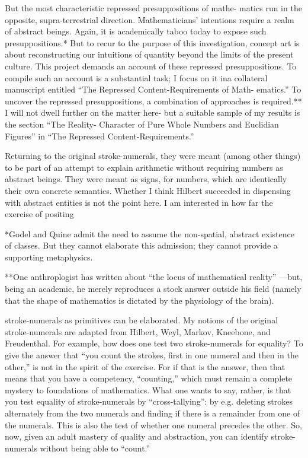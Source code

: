 But the most characteristic repressed presuppositions of mathe- 
matics run in the opposite, supra-terrestrial direction. Mathematicians’ 
intentions require a realm of abstract beings. Again, it is academically 
taboo today to expose such presuppositions.* But to recur to the 
purpose of this investigation, concept art is about reconstructing our 
intuitions of quantity beyond the limits of the present culture. This 
project demands an account of these repressed presuppositions. To 
compile such an account is a substantial task; I focus on it ina collateral 
manuscript entitled “The Repressed Content-Requirements of Math- 
ematics.” To uncover the repressed presuppositions, a combination of 
approaches is required.** I will not dwell further on the matter here- 
but a suitable sample of my results is the section “The Reality- 
Character of Pure Whole Numbers and Euclidian Figures” in “The 
Repressed Content-Requirements.” 

Returning to the original stroke-numerals, they were meant 
(among other things) to be part of an attempt to explain arithmetic 
without requiring numbers as abstract beings. They were meant as 
signs, for numbers, which are identically their own concrete semantics. 
Whether I think Hilbert succeeded in dispensing with abstract entities is 
not the point here. I am interested in how far the exercise of positing 


*Godel and Quine admit the need to assume the non-spatial, abstract 
existence of classes. But they cannot elaborate this admission; they cannot 
provide a supporting metaphysics. 

**One anthroplogist has written about “the locus of mathematical 
reality” —but, being an academic, he merely reproduces a stock answer outside 
his field (namely that the shape of mathematics is dictated by the physiology of 
the brain). 


stroke-numerals as primitives can be elaborated. My notions of the 
original stroke-numerals are adapted from Hilbert, Weyl, Markov, 
Kneebone, and Freudenthal. For example, how does one test two 
stroke-numerals for equality? To give the answer that “you count the 
strokes, first in one numeral and then in the other,” is not in the spirit of 
the exercise. For if that is the answer, then that means that you have a 
competency, “counting,” which must remain a complete mystery to 
foundations of mathematics. What one wants to say, rather, is that you 
test equality of stroke-numerals by “cross-tallying”: by e.g. deleting 
strokes alternately from the two numerals and finding if there is a 
remainder from one of the numerals. This is also the test of whether one 
numeral precedes the other. So, now, given an adult mastery of quality 
and abstraction, you can identify stroke-numerals without being able 
to “count.” 

